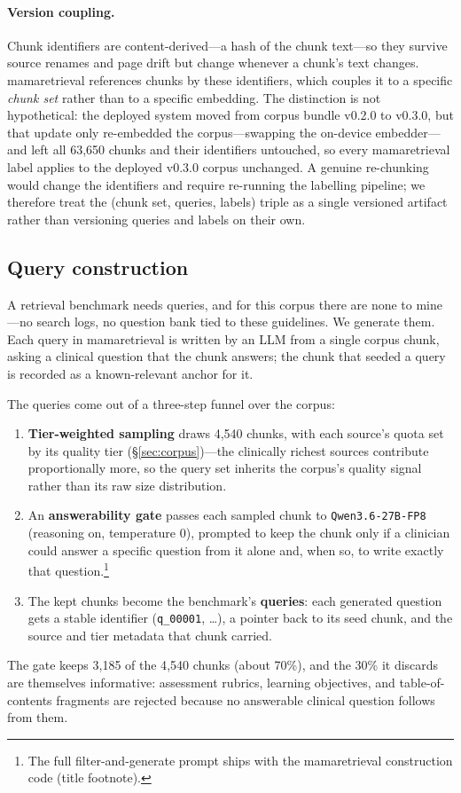 \paragraph{Version coupling.}
Chunk identifiers are content-derived---a hash of the chunk text---so they
survive source renames and page drift but change whenever a chunk's text
changes. mamaretrieval references chunks by these identifiers, which couples it
to a specific \emph{chunk set} rather than to a specific embedding. The
distinction is not hypothetical: the deployed system moved from corpus bundle
v0.2.0 to v0.3.0, but that update only re-embedded the corpus---swapping the
on-device embedder---and left all 63{,}650 chunks and their identifiers
untouched, so every mamaretrieval label applies to the deployed v0.3.0 corpus
unchanged. A genuine re-chunking would change the identifiers and require
re-running the labelling pipeline; we therefore treat the
(chunk set, queries, labels) triple as a single versioned artifact rather than
versioning queries and labels on their own.

\subsection{Query construction}
\label{sec:mr-queries}

A retrieval benchmark needs queries, and for this corpus there are none to
mine---no search logs, no question bank tied to these guidelines. We generate
them. Each query in mamaretrieval is written by an LLM from a single corpus
chunk, asking a clinical question that the chunk answers; the chunk that seeded a
query is recorded as a known-relevant anchor for it.

The queries come out of a three-step funnel over the corpus:
\begin{enumerate}
  \item \textbf{Tier-weighted sampling} draws 4{,}540 chunks, with each source's
  quota set by its quality tier (\S\ref{sec:corpus})---the clinically richest
  sources contribute proportionally more, so the query set inherits the corpus's
  quality signal rather than its raw size distribution.
  \item An \textbf{answerability gate} passes each sampled chunk to
  \texttt{Qwen3.6-27B-FP8} (reasoning on, temperature 0), prompted to keep the
  chunk only if a clinician could answer a specific question from it alone and,
  when so, to write exactly that question.\footnote{The full filter-and-generate
  prompt ships with the mamaretrieval construction code (title footnote).}
  \item The kept chunks become the benchmark's \textbf{queries}: each generated
  question gets a stable identifier (\texttt{q\_00001}, \dots), a pointer back to
  its seed chunk, and the source and tier metadata that chunk carried.
\end{enumerate}
The gate keeps 3{,}185 of the 4{,}540 chunks (about 70\%), and the 30\% it
discards are themselves informative: assessment rubrics, learning objectives, and
table-of-contents fragments are rejected because no answerable clinical question
follows from them.

